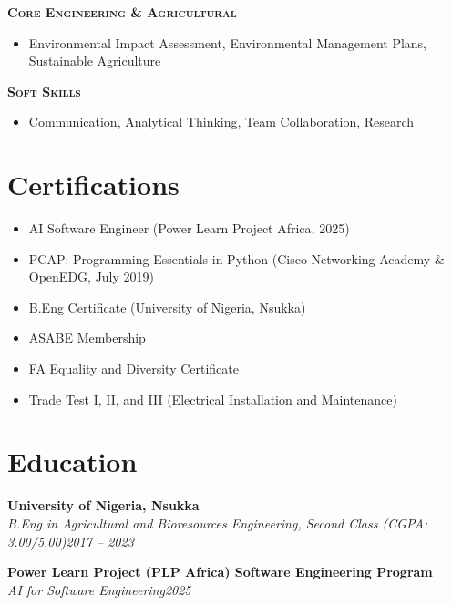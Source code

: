 \documentclass[10pt,letterpaper]{article}
\newcommand{\role}[3]{\par\vspace{3pt}\textbf{#1}\\ \textit{#2}\hfill\textit{#3}\par}
\newcommand{\subhead}[1]{\par\vspace{4pt}\noindent\textbf{\textsc{#1}}\par\vspace{1pt}}
\begin{document}
\subhead{Core Engineering \& Agricultural}
\begin{itemize}
\item Environmental Impact Assessment, Environmental Management Plans, Sustainable Agriculture
\end{itemize}

\subhead{Soft Skills}
\begin{itemize}
\item Communication, Analytical Thinking, Team Collaboration, Research
\end{itemize}

\section*{Certifications}
\begin{itemize}
\item AI Software Engineer (Power Learn Project Africa, 2025)
\item PCAP: Programming Essentials in Python (Cisco Networking Academy \& OpenEDG, July 2019)
\item B.Eng Certificate (University of Nigeria, Nsukka)
\item ASABE Membership
\item FA Equality and Diversity Certificate
\item Trade Test I, II, and III (Electrical Installation and Maintenance)
\end{itemize}

\section*{Education}

\role{University of Nigeria, Nsukka}{B.Eng in Agricultural and Bioresources Engineering, Second Class (CGPA: 3.00/5.00)}{2017 -- 2023}

\role{Power Learn Project (PLP Africa) Software Engineering Program}{AI for Software Engineering}{2025}
\end{document}
